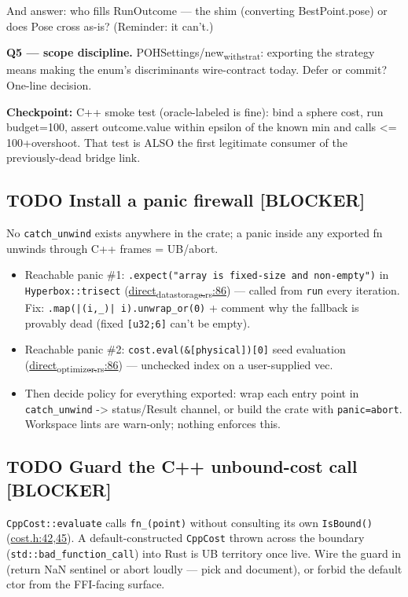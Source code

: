 \documentclass[11pt]{article}
\begin{document}
And answer: who fills RunOutcome — the shim (converting BestPoint.pose)
or does Pose cross as-is? (Reminder: it can't.)

\textbf{Q5 — scope discipline.} POHSettings/new\textsubscript{with}\textsubscript{strat}: exporting the
strategy means making the enum's discriminants wire-contract today.
Defer or commit? One-line decision.

\textbf{Checkpoint:} C++ smoke test (oracle-labeled is fine): bind a sphere
cost, run budget=100, assert outcome.value within epsilon of the known
min and calls <= 100+overshoot. That test is ALSO the first legitimate
consumer of the previously-dead bridge link.
\subsection{{\bfseries\sffamily TODO} Install a panic firewall [BLOCKER]}
\label{sec:org85cf675}
No \texttt{catch\_unwind} exists anywhere in the crate; a panic inside any
exported fn unwinds through C++ frames = UB/abort.
\begin{itemize}
\item Reachable panic \#1: \texttt{.expect("array is fixed-size and non-empty")} in
\texttt{Hyperbox::trisect} (\href{rust/direct-rs/src/direct\_data\_storage.rs}{direct\textsubscript{data}\textsubscript{storage.rs}:86}) — called from \texttt{run} every
iteration. Fix: \texttt{.map(|(i,\_)| i).unwrap\_or(0)} + comment why the
fallback is provably dead (fixed \texttt{[u32;6]} can't be empty).
\item Reachable panic \#2: \texttt{cost.eval(\&[physical])[0]} seed evaluation
(\href{rust/direct-rs/src/direct\_optimizer.rs}{direct\textsubscript{optimizer.rs}:86}) — unchecked index on a user-supplied vec.
\item Then decide policy for everything exported: wrap each entry point in
\texttt{catch\_unwind} -> status/Result channel, or build the crate with
\texttt{panic=abort}. Workspace lints are warn-only; nothing enforces this.
\end{itemize}
\subsection{{\bfseries\sffamily TODO} Guard the C++ unbound-cost call [BLOCKER]}
\label{sec:org0092e7c}
\texttt{CppCost::evaluate} calls \texttt{fn\_(point)} without consulting its own
\texttt{IsBound()} (\href{include/domain/cost.h}{cost.h:42,45}). A default-constructed \texttt{CppCost} thrown
across the boundary (\texttt{std::bad\_function\_call}) into Rust is UB territory
once live. Wire the guard in (return NaN sentinel or abort loudly — pick
and document), or forbid the default ctor from the FFI-facing surface.
\end{document}
